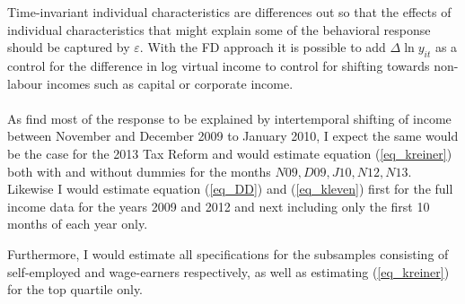 Time-invariant individual characteristics are differences out so that the effects of individual characteristics that might explain some of the behavioral response should be captured by $\varepsilon$. With the FD approach it is possible to add $\Delta \ln y_{it}$ as a control for the difference in log virtual income to control for shifting towards non-labour incomes such as capital or corporate income.
\\
\\
As \citet{kreiner2016tax} find most of the response to be explained by intertemporal shifting of income between November and December 2009 to January 2010, I expect the same would be the case for the 2013 Tax Reform and would estimate equation (\ref{eq_kreiner}) both with and without dummies for the months ${N09,D09,J10,N12,N13}$. Likewise I would estimate equation (\ref{eq_DD}) and (\ref{eq_kleven}) first for the full income data for the years 2009 and 2012 and next including only the first 10 months of each year only.

Furthermore, I would estimate all specifications for the subsamples consisting of self-employed and wage-earners respectively, as well as estimating (\ref{eq_kreiner}) for the top quartile only.
